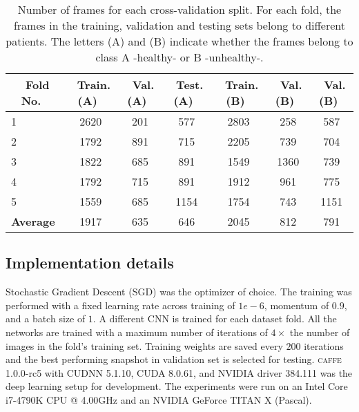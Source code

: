 \documentclass[runningheads]{llncs}
\begin{document}
\begin{table}[t!]
	\centering
	\caption{Number of frames for each cross-validation split. For each fold, the frames in the training, validation and testing sets belong to different patients. The letters (A) and (B) indicate whether the frames belong to class A -healthy- or B -unhealthy-.} 
	\begin{tabular}{lcccccc}
		\hline
		\multicolumn{1}{c}{\bfseries ~Fold No.~} & \multicolumn{1}{c}{\bfseries ~Train. (A)~} & \multicolumn{1}{c}{\bfseries ~Val. (A)~} & \multicolumn{1}{c}{\bfseries ~Test. (A)~} & \multicolumn{1}{c}{\bfseries ~Train. (B)~} & \multicolumn{1}{c}{\bfseries ~Val. (B)~} & \multicolumn{1}{c}{\bfseries ~Val. (B)~} \\ \hline	
		
		1 &  2620  &  201  &  577  &  2803  &  258   &  587 \\	
		
		2 &  1792  &  891  &  715  &  2205  &  739   &  704 \\
		
		3 &  1822  &  685  &  891  &  1549  &  1360  &  739 \\
		
		4 &  1792  &  715  &  891  &  1912  &  961   &  775 \\
		
		5 &  1559  &  685  &  1154  &  1754  &  743  &  1151 \\ \hline
		
		\textbf{Average}  &  1917  &  635  &  646  &  2045  &  812 &  791 \\ \hline
		
	\end{tabular}
	\vspace{0.2cm}
	\label{tab:dataset}
\end{table}

\subsection{Implementation details}
Stochastic Gradient Descent (SGD) was the optimizer of choice. The training was performed with a fixed learning rate across training of $1e-6$, momentum of $0.9$, and a batch size of $1$. A different CNN is trained for each dataset fold. All the networks are trained with a maximum number of iterations of $4\times$ the number of images in the fold's training set. Training weights are saved every $200$ iterations and the best performing snapshot in validation set is selected for testing. \textsc{caffe} 1.0.0-rc5 \cite{Jia2014} with \textsc{CUDNN} 5.1.10, \textsc{CUDA} 8.0.61, and \textsc{NVIDIA} driver 384.111 was the deep learning setup for development. The experiments were run on an Intel Core i7-4790K CPU @ 4.00GHz and an \textsc{NVIDIA} GeForce TITAN X (Pascal).
\end{document}
